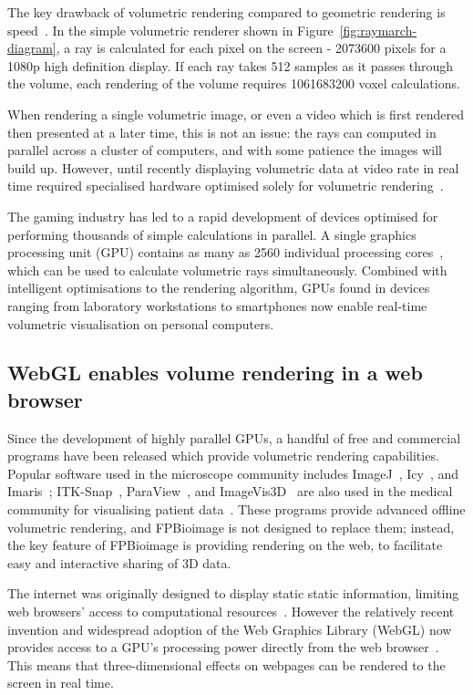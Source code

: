 The key drawback of volumetric rendering compared to geometric rendering is speed~\cite{dachille1998high}. 
In the simple volumetric renderer shown in Figure~\ref{fig:raymarch-diagram}, a ray is calculated for each pixel on the screen - \num{2073600} pixels for a 1080p high definition display. 
If each ray takes \num{512} samples as it passes through the volume, each rendering of the volume requires \num{1061683200} voxel calculations. 

When rendering a single volumetric image, or even a video which is first rendered then presented at a later time, this is not an issue: the rays can computed in parallel across a cluster of computers, and with some patience the images will build up. 
However, until recently displaying volumetric data at video rate in real time required specialised hardware optimised solely for volumetric rendering~\cite{ray2000resample}. 

The gaming industry has led to a rapid development of devices optimised for performing thousands of simple calculations in parallel. 
A single graphics processing unit (GPU) contains as many as 2560 individual processing cores~\cite{nvidia1080}, which can be used to calculate volumetric rays simultaneously. 
Combined with intelligent optimisations to the rendering algorithm, GPUs found in devices ranging from laboratory workstations to smartphones now enable real-time volumetric visualisation on personal computers. 

\subsection{WebGL enables volume rendering in a web browser}
Since the development of highly parallel GPUs, a handful of free and commercial programs have been released which provide volumetric rendering capabilities.
Popular software used in the microscope community includes ImageJ~\cite{schindelin2012fiji}, Icy~\cite{de2012icy}, and Imaris~\cite{imaris}; ITK-Snap~\cite{yushkevich2006user}, ParaView~\cite{ayachit2015paraview}, and ImageVis3D~\cite{imagevis3d2015interactive} are also used in the medical community for visualising patient data~\cite{madan2015creating}. 
These programs provide advanced offline volumetric rendering, and FPBioimage is not designed to replace them; instead, the key feature of FPBioimage is providing rendering on the web, to facilitate easy and interactive sharing of 3D data. 

The internet was originally designed to display static static information, limiting web browsers' access to computational resources~\cite{leiner2009brief}.
However the relatively recent invention and widespread adoption of the Web Graphics Library (WebGL) now provides access to a GPU's processing power directly from the web browser~\cite{khronos2009webgl}. 
This means that three-dimensional effects on webpages can be rendered to the screen in real time.

